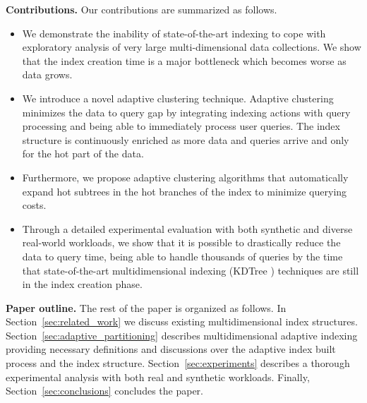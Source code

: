 \textbf{Contributions.} Our contributions are summarized as follows.
\begin{itemize}
  \setlength{\itemsep}{0pt}
  \setlength{\parskip}{0pt}
  \setlength{\parsep}{0pt}
\item We demonstrate the inability of state-of-the-art indexing to cope with exploratory analysis of very large multi-dimensional data collections. We show that the index creation time is a major bottleneck which becomes worse as data grows.
\item We introduce a novel adaptive clustering technique.  Adaptive clustering minimizes the data to query gap by integrating indexing actions with query processing and being able to immediately process user queries.
The index structure is continuously enriched as more data and queries arrive and only for the hot part of the data.
\item Furthermore,  we  propose adaptive clustering algorithms that automatically expand hot subtrees in the hot branches of the index to minimize querying costs.
\item Through a detailed experimental evaluation with both synthetic and diverse real-world workloads, we show that it is possible to drastically reduce the data to query time, being able to handle thousands of queries by the time that state-of-the-art multidimensional indexing (KDTree \cite{DBLP:journals/cacm/Bentley75}) techniques are still in the index creation phase.
\end{itemize}

\textbf{Paper outline.}
The rest of the paper is organized as follows.
In Section~\ref{sec:related_work} we discuss existing multidimensional index structures.
Section~\ref{sec:adaptive_partitioning} describes multidimensional adaptive indexing providing necessary definitions and discussions over the adaptive index built process and the index structure.
Section~\ref{sec:experiments} describes a thorough experimental analysis with both real and synthetic workloads.
Finally, Section~\ref{sec:conclusions} concludes the paper.

